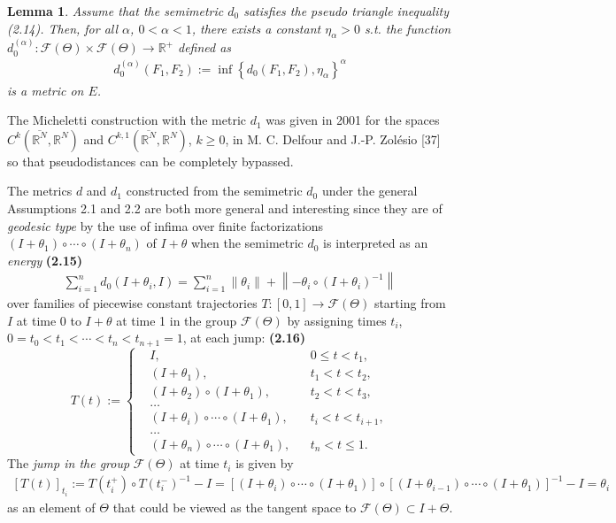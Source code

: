 \documentclass{book}
\numberwithin{equation}{section}
\newtheorem{lemma}{Lemma}[section]
\begin{document}
\begin{enumerate}
    \begin{lemma}
        Assume that the semimetric $d_0$ satisfies the pseudo triangle inequality (2.14). Then, for all $\alpha$, $0 < \alpha < 1$, there exists a constant $\eta_\alpha > 0$ s.t. the function $d_0^{(\alpha)}:\mathcal{F}(\Theta)\times\mathcal{F}(\Theta)\to\mathbb{R}^+$ defined as
        \begin{align*}
            d_0^{(\alpha)}(F_1,F_2) := \inf\left\{d_0(F_1,F_2),\eta_\alpha\right\}^\alpha
        \end{align*}
        is a metric on $E$.
    \end{lemma}
    The Micheletti construction with the metric $d_1$ was given in 2001 for the spaces $C^k(\overline{\mathbb{R}^N},\mathbb{R}^N)$ and $C^{k,1}(\overline{\mathbb{R}^N},\mathbb{R}^N)$, $k\ge 0$, in M. C. Delfour and J.-P. Zolésio [37] so that pseudodistances can be completely bypassed.
    
    The metrics $d$ and $d_1$ constructed from the semimetric $d_0$ under the general Assumptions 2.1 and 2.2 are both more general and interesting since they are of \textit{geodesic type} by the use of infima over finite factorizations $(I + \theta_1)\circ\cdots\circ(I + \theta_n)$ of $I + \theta$ when the semimetric $d_0$ is interpreted as an \textit{energy} \textbf{(2.15)}
    \begin{align*}
        \sum_{i=1}^n d_0\left(I + \theta_i,I\right) = \sum_{i=1}^n \|\theta_i\| + \left\|-\theta_i\circ\left(I + \theta_i\right)^{-1}\right\|
    \end{align*} 
    over families of piecewise constant trajectories 
    $T:[0,1]\to\mathcal{F}(\Theta)$ starting from $I$ at time 0 to $I + \theta$ at time 1 in the group $\mathcal{F}(\Theta)$ by assigning times $t_i$, $0 = t_0 < t_1 < \cdots < t_n < t_{n+1} = 1$, at each jump: \textbf{(2.16)}
    \begin{equation*}
        T(t) := \left\{\begin{split}
            &I, &&0\le t < t_1,\\
            &(I + \theta_1), &&t_1 < t < t_2,\\
            &(I + \theta_2)\circ(I + \theta_1), &&t_2 < t < t_3,\\
            &\ldots\\
            &(I + \theta_i)\circ\cdots\circ(I + \theta_1), &&t_i < t < t_{i+1},\\
            &\ldots\\
            &(I + \theta_n)\circ\cdots\circ(I + \theta_1), &&t_n < t\le 1.
        \end{split}\right.
    \end{equation*}
    The \textit{jump in the group} $\mathcal{F}(\Theta)$ at time $t_i$ is given by
    \begin{align*}
        \left[T(t)\right]_{t_i} := T(t_i^+)\circ T(t_i^-)^{-1} - I = \left[(I + \theta_i)\circ\cdots\circ(I + \theta_1)\right]\circ\left[(I + \theta_{i-1})\circ\cdots\circ(I + \theta_1)\right]^{-1} - I = \theta_i
    \end{align*}
    as an element of $\Theta$ that could be viewed as the tangent space to $\mathcal{F}(\Theta)\subset I + \Theta$.
    

\end{enumerate}
\end{document}
